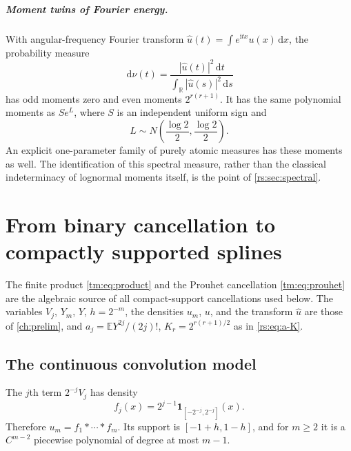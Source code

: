 \documentclass[11pt,a4paper,oneside,openany]{book}
\numberwithin{equation}{chapter}
\theoremstyle{definition}
\theoremstyle{remark}
\newcommand{\R}{\mathbb R}
\newcommand{\E}{\mathbb E}
\newcommand{\dd}{\,\mathrm d}
\newcommand{\ii}{\mathrm i}
\begin{document}
\paragraph{Moment twins of Fourier energy.}
With angular-frequency Fourier transform
$\widehat u(t)=\int e^{\ii tx}u(x)\dd x$, the probability measure
\begin{equation}
 \dd\nu(t)=\frac{|\widehat u(t)|^2\dd t}{\int_{\R}|\widehat u(s)|^2\dd s}
 \label{rs:eq:intro-nu}
\end{equation}
has odd moments zero and even moments $2^{r(r+1)}$. It has the same
polynomial moments as $S e^L$, where $S$ is an independent uniform sign
and
\begin{equation}
 L\sim N\left(\frac{\log2}{2},\frac{\log2}{2}\right).
 \label{rs:eq:intro-lognormal}
\end{equation}
An explicit one-parameter family of purely atomic measures has these
moments as well. The identification of this spectral measure, rather
than the classical indeterminacy of lognormal moments itself, is the
point of \cref{rs:sec:spectral}.

\chapter{From binary cancellation to compactly supported splines}
\label{rs:sec:basic}
The finite product \eqref{tm:eq:product} and the Prouhet cancellation
\eqref{tm:eq:prouhet} are the algebraic source of all compact-support
cancellations used below. The variables $V_j$, $Y_m$, $Y$, $h=2^{-m}$, the
densities $u_m$, $u$, and the transform $\widehat u$ are those of
\cref{ch:prelim}, and $a_j=\E Y^{2j}/(2j)!$, $K_r=2^{r(r+1)/2}$ as in
\eqref{rs:eq:a-K}.


\section{The continuous convolution model}

The $j$th term $2^{-j}V_j$ has density
\begin{equation}
 f_j(x)=2^{j-1}\mathbf1_{[-2^{-j},2^{-j}]}(x).
\end{equation}
Therefore $u_m=f_1*\cdots*f_m$. Its support is
$[-1+h,1-h]$, and for $m\geq2$ it is a $C^{m-2}$ piecewise polynomial
of degree at most $m-1$.
\end{document}
